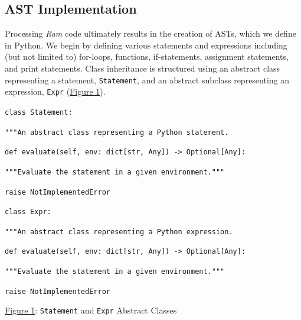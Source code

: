 \documentclass[11pt]{article}
\begin{document}
\subsection{AST Implementation}

Processing \emph{Ram} code ultimately results in the creation of ASTs, which we define in Python. We begin by defining various statements and expressions including (but not limited to) for-loops, functions, if-statements, assignment statements, and print statements. Class inheritance is structured using an abstract class representing a statement, \texttt{Statement}, and an abstract subclass representing an expression, \texttt{Expr} (\hyperlink{fig1}{Figure 1}).

\bigskip

\hypertarget{fig1}{}

\texttt{\textcolor{keywordred}{class} \textcolor{keywordorange}{Statement}:}

\quad\quad \texttt{\textcolor{commentblue}{"""An abstract class representing a Python statement.}}

\quad\quad{\texttt{\textcolor{commentblue}{"""}}}

\quad\quad\texttt{\textcolor{keywordred}{def} \textcolor{keywordpurple}{evaluate}(self,\,env:\,\textcolor{keywordorange}{dict[str, Any]}) -> Optional[Any]:}

\quad\quad\texttt{"""Evaluate the statement in a given environment."""}

\quad\quad \quad\quad \texttt{\textcolor{keywordred}{raise} \textcolor{keywordorange}{NotImplementedError}}

\bigskip

\texttt{\textcolor{keywordred}{class} \textcolor{keywordorange}{Expr}:}

\quad\quad \texttt{\textcolor{commentblue}{"""An abstract class representing a Python expression.}}

\quad\quad{\texttt{\textcolor{commentblue}{"""}}}

\quad\quad\texttt{\textcolor{keywordred}{def} \textcolor{keywordpurple}{evaluate}(self,\,env:\,\textcolor{keywordorange}{dict[str, Any]}) -> Optional[Any]:}

\quad\quad\texttt{"""Evaluate the statement in a given environment."""}

\quad\quad \quad\quad \texttt{\textcolor{keywordred}{raise} \textcolor{keywordorange}{NotImplementedError}}

\bigskip

\begin{center}
    \small{\hyperlink{fig1}{Figure 1}: \texttt{Statement} and \texttt{Expr} Abstract Classes}
\end{center}
\end{document}
